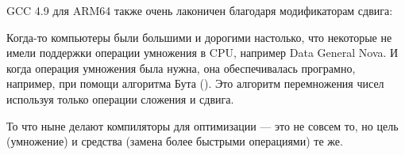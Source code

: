 






GCC 4.9 для ARM64 также очень лаконичен благодаря модификаторам сдвига:




Когда-то компьютеры были большими и дорогими настолько, что некоторые не имели поддержки операции умножения
в \ac{CPU}, например Data General Nova.
И когда операция умножения была нужна, она обеспечивалась програмно, например, при помощи алгоритма Бута
().
Это алгоритм перемножения чисел используя только операции сложения и сдвига.

То что ныне делают компиляторы для оптимизации --- это не совсем то,
но цель (умножение) и средства (замена более быстрыми операциями) те же.

